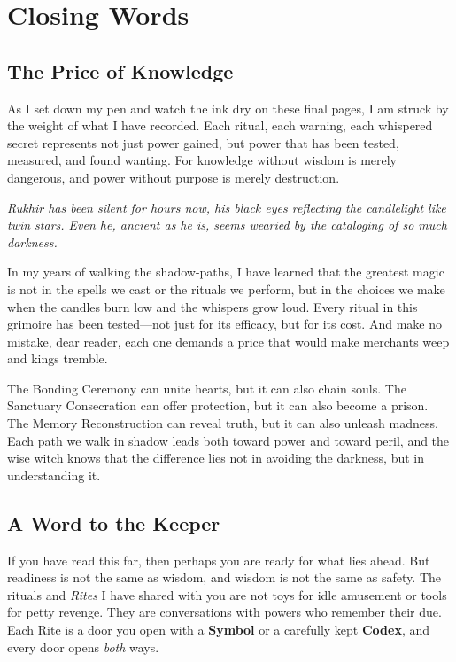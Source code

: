 \documentclass[12pt,twoside]{book}
\newcommand{\shadow}[1]{\textit{#1}}
\begin{document}
\chapter{Closing Words}

\section*{The Price of Knowledge}

\lettrine[lines=3]{A}{}s I set down my pen and watch the ink dry on these final pages, I am struck by the weight of what I have recorded. Each ritual, each warning, each whispered secret represents not just power gained, but power that has been tested, measured, and found wanting. For knowledge without wisdom is merely dangerous, and power without purpose is merely destruction.

\shadow{Rukhir has been silent for hours now, his black eyes reflecting the candlelight like twin stars. Even he, ancient as he is, seems wearied by the cataloging of so much darkness.}

In my years of walking the shadow-paths, I have learned that the greatest magic is not in the spells we cast or the rituals we perform, but in the choices we make when the candles burn low and the whispers grow loud. Every ritual in this grimoire has been tested—not just for its efficacy, but for its cost. And make no mistake, dear reader, each one demands a price that would make merchants weep and kings tremble.

The Bonding Ceremony can unite hearts, but it can also chain souls. The Sanctuary Consecration can offer protection, but it can also become a prison. The Memory Reconstruction can reveal truth, but it can also unleash madness. Each path we walk in shadow leads both toward power and toward peril, and the wise witch knows that the difference lies not in avoiding the darkness, but in understanding it.

\section*{A Word to the Keeper}

If you have read this far, then perhaps you are ready for what lies ahead. But readiness is not the same as wisdom, and wisdom is not the same as safety. The rituals and \emph{Rites} I have shared with you are not toys for idle amusement or tools for petty revenge. They are conversations with powers who remember their due. Each Rite is a door you open with a \textbf{Symbol} or a carefully kept \textbf{Codex}, and every door opens \emph{both} ways.
\end{document}
